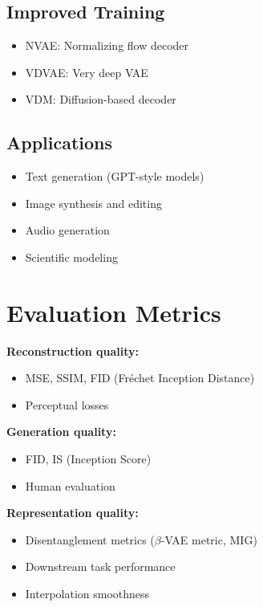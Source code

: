 \subsection{Improved Training}

\begin{itemize}
    \item NVAE: Normalizing flow decoder
    \item VDVAE: Very deep VAE
    \item VDM: Diffusion-based decoder
\end{itemize}

\subsection{Applications}

\begin{itemize}
    \item Text generation (GPT-style models)
    \item Image synthesis and editing
    \item Audio generation
    \item Scientific modeling
\end{itemize}

\section{Evaluation Metrics}

\textbf{Reconstruction quality:}
\begin{itemize}
    \item MSE, SSIM, FID (Fréchet Inception Distance)
    \item Perceptual losses
\end{itemize}

\textbf{Generation quality:}
\begin{itemize}
    \item FID, IS (Inception Score)
    \item Human evaluation
\end{itemize}

\textbf{Representation quality:}
\begin{itemize}
    \item Disentanglement metrics ($\beta$-VAE metric, MIG)
    \item Downstream task performance
    \item Interpolation smoothness
\end{itemize}

